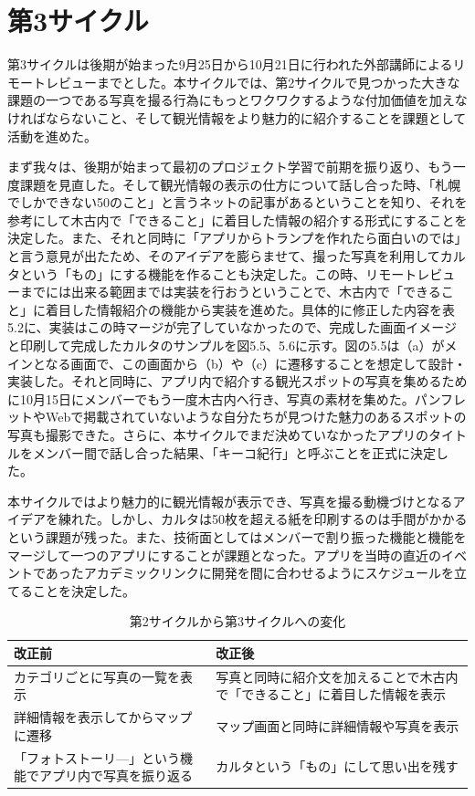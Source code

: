 \section{第3サイクル}
第3サイクルは後期が始まった9月25日から10月21日に行われた外部講師によるリモートレビューまでとした。本サイクルでは、第2サイクルで見つかった大きな課題の一つである写真を撮る行為にもっとワクワクするような付加価値を加えなければならないこと、そして観光情報をより魅力的に紹介することを課題として活動を進めた。
\par まず我々は、後期が始まって最初のプロジェクト学習で前期を振り返り、もう一度課題を見直した。そして観光情報の表示の仕方について話し合った時、「札幌でしかできない50のこと」と言うネットの記事があるということを知り、それを参考にして木古内で「できること」に着目した情報の紹介する形式にすることを決定した。また、それと同時に「アプリからトランプを作れたら面白いのでは」と言う意見が出たため、そのアイデアを膨らませて、撮った写真を利用してカルタという「もの」にする機能を作ることも決定した。この時、リモートレビューまでには出来る範囲までは実装を行おうということで、木古内で「できること」に着目した情報紹介の機能から実装を進めた。具体的に修正した内容を表5.2に、実装はこの時マージが完了していなかったので、完成した画面イメージと印刷して完成したカルタのサンプルを図5.5、5.6に示す。図の5.5は（a）がメインとなる画面で、この画面から（b）や（c）に遷移することを想定して設計・実装した。それと同時に、アプリ内で紹介する観光スポットの写真を集めるために10月15日にメンバーでもう一度木古内へ行き、写真の素材を集めた。パンフレットやWebで掲載されていないような自分たちが見つけた魅力のあるスポットの写真も撮影できた。さらに、本サイクルでまだ決めていなかったアプリのタイトルをメンバー間で話し合った結果、「キーコ紀行」と呼ぶことを正式に決定した。
\par 本サイクルではより魅力的に観光情報が表示でき、写真を撮る動機づけとなるアイデアを練れた。しかし、カルタは50枚を超える紙を印刷するのは手間がかかるという課題が残った。また、技術面としてはメンバーで割り振った機能と機能をマージして一つのアプリにすることが課題となった。アプリを当時の直近のイベントであったアカデミックリンクに開発を間に合わせるようにスケジュールを立てることを決定した。\newpage

\begin{table}[htb]
\centering
\addtocounter{table}{+0}
\caption{第2サイクルから第3サイクルへの変化}
  \begin{tabular}{|l|l|} \hline
    改正前&改正後  \\ \hline 
    \parbox{20zw}{カテゴリごとに写真の一覧を表示} & \parbox{20zw}{写真と同時に紹介文を加えることで木古内で「できること」に着目した情報を表示} \\  \hline
    \parbox{20zw}{詳細情報を表示してからマップに遷移} &\parbox{20zw}{マップ画面と同時に詳細情報や写真を表示}\\ \hline
    \parbox{20zw}{「フォトストーリ—」という機能でアプリ内で写真を振り返る} & \parbox{20zw}{カルタという「もの」にして思い出を残す}\\ \hline
  \end{tabular} 
\end{table}

